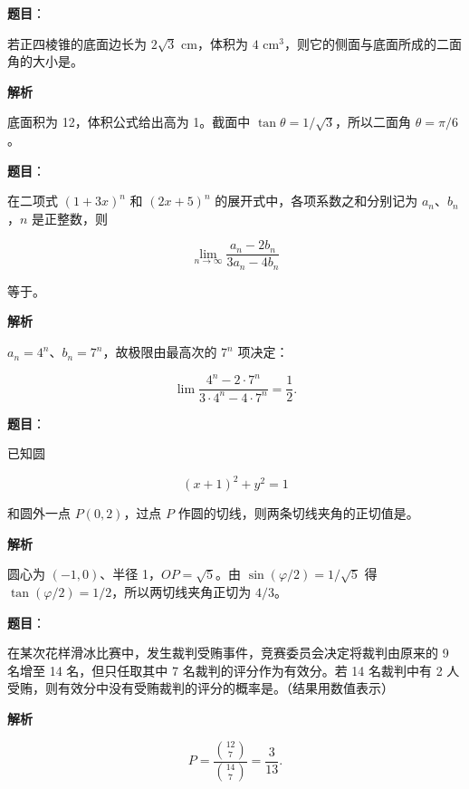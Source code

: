 \begin{answer}

\textbf{题目}：

若正四棱锥的底面边长为 $2\sqrt3\text{ cm}$，体积为 $4\text{ cm}^3$，则它的侧面与底面所成的二面角的大小是\gkblank{}。

\textbf{解析}

底面积为 12，体积公式给出高为 1。截面中 $\tan\theta=1/\sqrt3$，所以二面角 $\theta=\pi/6$。


\end{answer}
\begin{answer}

\textbf{题目}：

在二项式 $(1+3x)^n$ 和 $(2x+5)^n$ 的展开式中，各项系数之和分别记为 $a_n\text{、}b_n$，$n$ 是正整数，则

\nopagebreak[4]
\[
\lim_{n\to\infty}\frac{a_n-2b_n}{3a_n-4b_n}
\]

等于\gkblank{}。

\textbf{解析}

$a_n=4^n$、$b_n=7^n$，故极限由最高次的 $7^n$ 项决定：

\nopagebreak[4]
\[
\lim\frac{4^n-2\cdot7^n}{3\cdot4^n-4\cdot7^n}=\frac12.
\]


\end{answer}
\begin{answer}

\textbf{题目}：

已知圆

\nopagebreak[4]
\[
(x+1)^2+y^2=1
\]

和圆外一点 $P(0,2)$，过点 $P$ 作圆的切线，则两条切线夹角的正切值是\gkblank{}。

\textbf{解析}

圆心为 $(-1,0)$、半径 1，$OP=\sqrt5$。由 $\sin(\varphi/2)=1/\sqrt5$ 得 $\tan(\varphi/2)=1/2$，所以两切线夹角正切为 $4/3$。


\end{answer}
\begin{answer}

\textbf{题目}：

在某次花样滑冰比赛中，发生裁判受贿事件，竞赛委员会决定将裁判由原来的 9 名增至 14 名，但只任取其中 7 名裁判的评分作为有效分。若 14 名裁判中有 2 人受贿，则有效分中没有受贿裁判的评分的概率是\gkblank{}。（结果用数值表示）

\textbf{解析}

\nopagebreak[4]
\[
P=\frac{\binom{12}{7}}{\binom{14}{7}}=\frac3{13}.
\]


\end{answer}
